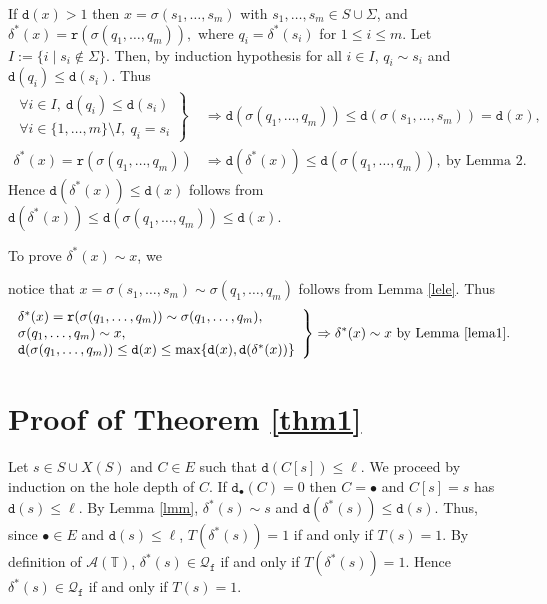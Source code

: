 \documentclass[preprint,12pt,english]{article}
\def\hole{\bullet}
\def\tr{\mathtt{r}}
\def\cA{\mathcal{A}}
\def\cQ{\mathcal{Q}}
\def\depth{\mathtt{d}}
\newcommand\pair[1]{\langle{#1}\rangle}
\newcommand\comment[1]{}
\begin{document}
If $\depth(x)>1$ then $x=\sigma(s_1,\ldots,s_m)$ with $s_1,\ldots,s_m\in S\cup\Sigma$, and $\delta^*(x)=\tr(\sigma(q_1,\ldots,q_m)),$ where $q_i=\delta^*(s_i)$ for $1\leq i\leq m.$ Let $I:=\{i\mid s_i\not\in \Sigma\}.$ Then, by induction hypothesis for all $i\in I$, $q_i\sim s_i$ and $\depth(q_i)\leq\depth(s_i)$. 
Thus
$$\begin{array}{rl}
\left.\begin{array}{l}
\forall i\in I,\ \depth(q_i)\leq\depth(s_i)\\
\forall i\in \{1,\ldots,m\}\setminus I,\ q_i=s_i
\end{array}\right\}&
\Rightarrow \depth(\sigma(q_1,\ldots,q_m))\leq\depth(\sigma(s_1,\ldots,s_m))=\depth(x),\\
\delta^*(x)=\tr(\sigma(q_1,\ldots,q_m))&\Rightarrow\depth(\delta^*(x))\leq\depth(\sigma(q_1,\ldots,q_m)),\ \text{by Lemma 2.}
\end{array}$$
Hence $\depth(\delta^*(x))\leq \depth(x)$ follows from $\depth(\delta^*(x))\leq\depth(\sigma(q_1,\ldots,q_m))\leq\depth(x).$ 

To prove  $\delta^*(x)\sim x$, we 
\comment{reason as follows. Suppose $I=\{i_1,\ldots,i_p\}$, and 
let $x_0:=x$, and $x_j:=x_{j-1}[q_{i_j}]_{i_j}$ for $1\leq j\leq p$. 
For all $i_j\in I$ we have
$$\left.\begin{array}{r}
s_{i_j},q_{i_j}\in S\\ 
s_{i_j}\sim q_{i_j}\ (\text{by induction hypothesis})\\
x_j[\hole]_{i_j}\in\sigma_\hole\pair{S} 
\end{array}\right\}\Rightarrow x_{j-1}=x_j[s_{i_j}]_{i_j}\sim x_j[q_{i_j}]_{i_j}=x_j$$
because the observation table $(S,E,T,\ell)$ is consistent. Also, $\depth(x_j)\geq\depth(x_{j+1})$ whenever $0\leq j< p$ because, by induction hypothesis, $\depth(s_{i_j})\geq\depth(q_{i_j})$ for all $j\in I$. Hence $x=x_{i_0}\sim x_{i_p}=\sigma(q_1,\ldots,q_m)$ by repeated applications of Lemma~\ref{lema1}. }
notice that $x=\sigma(s_1,\ldots,s_m)\sim\sigma(q_1,\ldots,q_m)$ follows from Lemma \ref{lele}.
Thus
$$\left.\begin{array}{l}
\delta^*(x)=\tr(\sigma(q_1,\ldots,q_m))\sim \sigma(q_1,\ldots,q_m),\\
\sigma(q_1,\ldots,q_m)\sim x,\\
\depth(\sigma(q_1,\ldots,q_m))\leq \depth(x)\leq\max\{\depth(x),\depth(\delta^*(x))\}
\end{array}\right\}\Rightarrow \delta^*(x)\sim x\ \text{by Lemma \ref{lema1}}.$$
\section{Proof of Theorem \ref{thm1}}
Let $s\in S\cup X(S)$ and $C\in E$ such that $\depth(C[s])\leq\ell$. We proceed by induction on the hole depth of $C$. 
If $\depth_\hole(C)=0$ then $C=\hole$ and $C[s]=s$ has $\depth(s)\leq\ell.$  By Lemma \ref{lmm}, $\delta^*(s)\sim s$ and $\depth(\delta^*(s))\leq\depth(s).$ Thus, since $\hole\in E$ and $\depth(s)\leq\ell$, $T(\delta^*(s))=1$ if and only if $T(s)=1.$
By definition of $\cA(\mathbb{T})$, $\delta^*(s)\in \cQ_{\mathtt{f}}$ if and only if $T(\delta^*(s))=1$. Hence $\delta^*(s)\in \cQ_{\mathtt{f}}$ if and only if $T(s)=1.$
\end{document}
